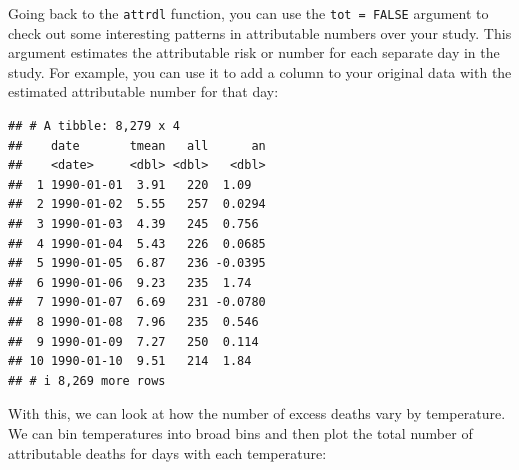 \documentclass[
]{book}
\newenvironment{Shaded}{\begin{snugshade}}{\end{snugshade}}
\newcommand{\AttributeTok}[1]{\textcolor[rgb]{0.13,0.29,0.53}{#1}}
\newcommand{\ConstantTok}[1]{\textcolor[rgb]{0.56,0.35,0.01}{#1}}
\newcommand{\DecValTok}[1]{\textcolor[rgb]{0.00,0.00,0.81}{#1}}
\newcommand{\FunctionTok}[1]{\textcolor[rgb]{0.13,0.29,0.53}{\textbf{#1}}}
\newcommand{\NormalTok}[1]{#1}
\newcommand{\OtherTok}[1]{\textcolor[rgb]{0.56,0.35,0.01}{#1}}
\newcommand{\SpecialCharTok}[1]{\textcolor[rgb]{0.81,0.36,0.00}{\textbf{#1}}}
\newcommand{\StringTok}[1]{\textcolor[rgb]{0.31,0.60,0.02}{#1}}
\begin{document}
Going back to the \texttt{attrdl} function, you can use the \texttt{tot\ =\ FALSE} argument to check out some interesting patterns in attributable numbers over your study. This argument estimates the attributable risk or number for each separate day in the study. For example, you can use it to add a column to your original data with the estimated attributable number for that day:

\begin{Shaded}
\end{Shaded}

\begin{verbatim}
## # A tibble: 8,279 x 4
##    date       tmean   all      an
##    <date>     <dbl> <dbl>   <dbl>
##  1 1990-01-01  3.91   220  1.09  
##  2 1990-01-02  5.55   257  0.0294
##  3 1990-01-03  4.39   245  0.756 
##  4 1990-01-04  5.43   226  0.0685
##  5 1990-01-05  6.87   236 -0.0395
##  6 1990-01-06  9.23   235  1.74  
##  7 1990-01-07  6.69   231 -0.0780
##  8 1990-01-08  7.96   235  0.546 
##  9 1990-01-09  7.27   250  0.114 
## 10 1990-01-10  9.51   214  1.84  
## # i 8,269 more rows
\end{verbatim}

With this, we can look at how the number of excess deaths vary by temperature. We can bin temperatures into broad bins and then plot the total number of attributable deaths for days with each temperature:
\end{document}
